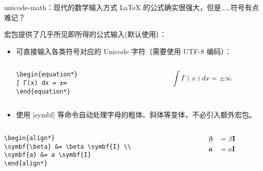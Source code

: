 \begin{frame}[fragile,label={frame:unicode-math}]{unicode-math：现代的数学输入方式}
\LaTeX{} 的公式确实很强大，但是……符号有点难记？

 宏包提供了几乎所见即所得的公式输入(\SJTUThesis 默认使用）：

\begin{itemize}
  \item 可直接输入各类符号对应的 Unicode 字符（需要使用 UTF-8 编码）：
  
  \begin{columns}[c]
    \begin{column}{0.45\textwidth}
      \begin{lstlisting}[basicstyle=\ttfamily]
\begin{equation*}
∫ Γ(x) dx = ±∞
\end{equation*}
      \end{lstlisting}
    \end{column}\hspace{1em}
    \begin{column}{0.45\textwidth}
      \begin{equation*}
        ∫ Γ(x) dx = ±∞
      \end{equation*}
      \end{column}
    \end{columns}
  \item 使用 |symbf| 等命令自动处理字母的粗体、斜体等变体，不必引入额外宏包。
\end{itemize}

\begin{columns}[c]
  \begin{column}{0.45\textwidth}
    \begin{lstlisting}[basicstyle=\ttfamily]
\begin{align*}
\symbf{\beta} &= \beta \symbf{I} \\
\symbf{a} &= a \symbf{I}
\end{align*}
\end{lstlisting}
\end{column}\hspace{1em}
  \begin{column}{0.45\textwidth}
    \begin{align*}
      \symbf{\beta} &= \beta \symbf{I} \\
      \symbf{a} &= a \symbf{I}
    \end{align*}
  \end{column}
\end{columns}

\end{frame}

